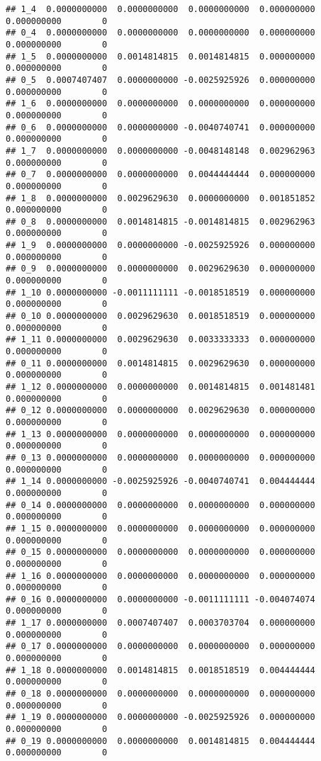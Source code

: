 \documentclass[]{article}
\begin{document}
\begin{verbatim}
## 1_4  0.0000000000  0.0000000000  0.0000000000  0.000000000 0.000000000        0
## 0_4  0.0000000000  0.0000000000  0.0000000000  0.000000000 0.000000000        0
## 1_5  0.0000000000  0.0014814815  0.0014814815  0.000000000 0.000000000        0
## 0_5  0.0007407407  0.0000000000 -0.0025925926  0.000000000 0.000000000        0
## 1_6  0.0000000000  0.0000000000  0.0000000000  0.000000000 0.000000000        0
## 0_6  0.0000000000  0.0000000000 -0.0040740741  0.000000000 0.000000000        0
## 1_7  0.0000000000  0.0000000000 -0.0048148148  0.002962963 0.000000000        0
## 0_7  0.0000000000  0.0000000000  0.0044444444  0.000000000 0.000000000        0
## 1_8  0.0000000000  0.0029629630  0.0000000000  0.001851852 0.000000000        0
## 0_8  0.0000000000  0.0014814815 -0.0014814815  0.002962963 0.000000000        0
## 1_9  0.0000000000  0.0000000000 -0.0025925926  0.000000000 0.000000000        0
## 0_9  0.0000000000  0.0000000000  0.0029629630  0.000000000 0.000000000        0
## 1_10 0.0000000000 -0.0011111111 -0.0018518519  0.000000000 0.000000000        0
## 0_10 0.0000000000  0.0029629630  0.0018518519  0.000000000 0.000000000        0
## 1_11 0.0000000000  0.0029629630  0.0033333333  0.000000000 0.000000000        0
## 0_11 0.0000000000  0.0014814815  0.0029629630  0.000000000 0.000000000        0
## 1_12 0.0000000000  0.0000000000  0.0014814815  0.001481481 0.000000000        0
## 0_12 0.0000000000  0.0000000000  0.0029629630  0.000000000 0.000000000        0
## 1_13 0.0000000000  0.0000000000  0.0000000000  0.000000000 0.000000000        0
## 0_13 0.0000000000  0.0000000000  0.0000000000  0.000000000 0.000000000        0
## 1_14 0.0000000000 -0.0025925926 -0.0040740741  0.004444444 0.000000000        0
## 0_14 0.0000000000  0.0000000000  0.0000000000  0.000000000 0.000000000        0
## 1_15 0.0000000000  0.0000000000  0.0000000000  0.000000000 0.000000000        0
## 0_15 0.0000000000  0.0000000000  0.0000000000  0.000000000 0.000000000        0
## 1_16 0.0000000000  0.0000000000  0.0000000000  0.000000000 0.000000000        0
## 0_16 0.0000000000  0.0000000000 -0.0011111111 -0.004074074 0.000000000        0
## 1_17 0.0000000000  0.0007407407  0.0003703704  0.000000000 0.000000000        0
## 0_17 0.0000000000  0.0000000000  0.0000000000  0.000000000 0.000000000        0
## 1_18 0.0000000000  0.0014814815  0.0018518519  0.004444444 0.000000000        0
## 0_18 0.0000000000  0.0000000000  0.0000000000  0.000000000 0.000000000        0
## 1_19 0.0000000000  0.0000000000 -0.0025925926  0.000000000 0.000000000        0
## 0_19 0.0000000000  0.0000000000  0.0014814815  0.004444444 0.000000000        0

\end{verbatim}
\end{document}
